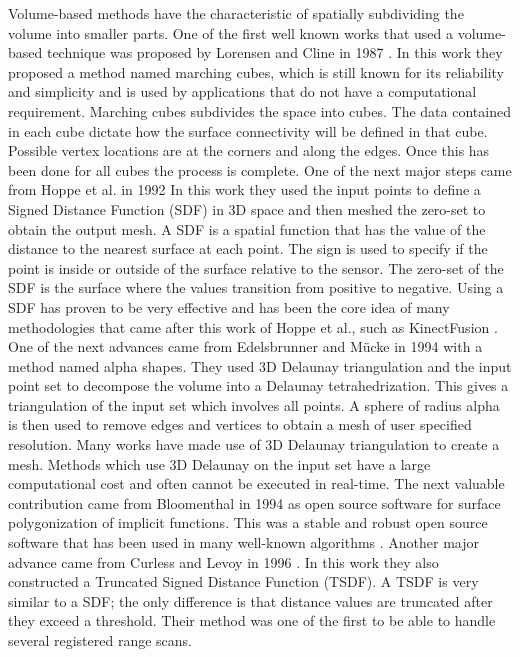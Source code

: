 Volume-based methods have the characteristic of spatially subdividing the volume
into smaller parts. One of the first well known works that used a volume-based
technique was proposed by Lorensen and Cline in 1987 \cite{Lorensen1987}. In
this work they proposed a method named marching cubes, which is still known for
its reliability and simplicity and is used by applications that do not have a
computational requirement. Marching cubes subdivides the space into cubes. The
data contained in each cube dictate how the surface connectivity will be defined
in that cube. Possible vertex locations are at the corners and along the edges.
Once this has been done for all cubes the process is complete. One of the next
major steps came from Hoppe et al. in 1992 \cite{Hoppe1992} In this work they
used the input points to define a Signed Distance Function (SDF) in 3D space and
then meshed the zero-set to obtain the output mesh. A SDF is a spatial function
that has the value of the distance to the nearest surface at each point. The
sign is used to specify if the point is inside or outside of the surface
relative to the sensor. The zero-set of the SDF is the surface where the values
transition from positive to negative. Using a SDF has proven to be very
effective and has been the core idea of many methodologies that came after this
work of Hoppe et al., such as KinectFusion \cite{Newcombe2011a}. One of the next
advances came from Edelsbrunner and M\"{u}cke in 1994 \cite{Edelsbrunner1994}
with a method named alpha shapes. They used 3D Delaunay triangulation and the
input point set to decompose the volume into a Delaunay tetrahedrization. This
gives a triangulation of the input set which involves all points. A sphere of
radius alpha is then used to remove edges and vertices to obtain a mesh of user
specified resolution. Many works have made use of 3D Delaunay triangulation to
create a mesh. Methods which use 3D Delaunay on the input set have a large
computational cost and often cannot be executed in real-time. The next valuable
contribution came from Bloomenthal in 1994 \cite{Bloomenthal1994} as open source
software for surface polygonization of implicit functions. This was a stable and
robust open source software that has been used in many well-known algorithms
\cite{Newcombe2010}. Another major advance came from Curless and Levoy in 1996
\cite{Curless1996}. In this work they also constructed a Truncated Signed
Distance Function (TSDF). A TSDF is very similar to a SDF; the only difference
is that distance values are truncated after they exceed a threshold. Their
method was one of the first to be able to handle several registered range scans.
